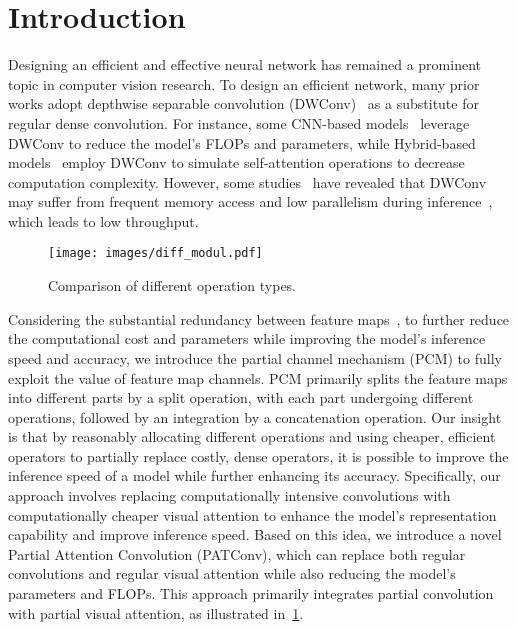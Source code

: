 \section{Introduction}
\label{sec:intro}
Designing an efficient and effective neural network has remained a prominent topic in computer vision research. To design an efficient network, many prior works adopt depthwise separable convolution (DWConv)~\cite{Howard2017} as a substitute for regular dense convolution. For instance, some CNN-based models~\cite{Sandler2018a, Tan2019} leverage DWConv to reduce the model's FLOPs and parameters, while Hybrid-based models~\cite{yang2022focal, hou2022conv2former, Rao2022} employ DWConv to simulate self-attention operations to decrease computation complexity. However, some studies~\cite{Ma2018, ding2022scaling} have revealed that DWConv may suffer from frequent memory access and low parallelism during inference~\cite{Chen2023}, which leads to low throughput.

\begin{figure}[ht]
  \centering
  \texttt{[image: images/diff\_modul.pdf]}
  \caption{Comparison of different operation types.}
  \label{fig:diff_modul}
\end{figure}

Considering the substantial redundancy between feature maps~\cite{Han2020, Chen2023}, to further reduce the computational cost and parameters while improving the model's inference speed and accuracy, we introduce the partial channel mechanism (PCM) to fully exploit the value of feature map channels. PCM primarily splits the feature maps into different parts by a split operation, with each part undergoing different operations, followed by an integration by a concatenation operation. Our insight is that by reasonably allocating different operations and using cheaper, efficient operators to partially replace costly, dense operators, it is possible to improve the inference speed of a model while further enhancing its accuracy. Specifically, our approach involves replacing computationally intensive convolutions with computationally cheaper visual attention to enhance the model's representation capability and improve inference speed. Based on this idea, we introduce a novel Partial Attention Convolution (PATConv), which can replace both regular convolutions and regular visual attention while also reducing the model's parameters and FLOPs. This approach primarily integrates partial convolution with partial visual attention, as illustrated in~\cref{fig:diff_modul}.

